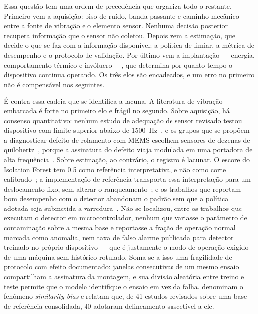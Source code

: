 Essa questão tem uma ordem de precedência que organiza todo o restante. Primeiro vem a
aquisição: piso de ruído, banda passante e caminho mecânico entre a fonte de vibração e o
elemento sensor. Nenhuma decisão posterior recupera informação que o sensor não coletou.
Depois vem a estimação, que decide o que se faz com a informação disponível: a política de
limiar, a métrica de desempenho e o protocolo de validação. Por último vem a implantação
--- energia, comportamento térmico e invólucro ---, que determina por quanto tempo o
dispositivo continua operando. Os três elos são encadeados, e um erro no primeiro não é
compensável nos seguintes.

É contra essa cadeia que se identifica a lacuna. A literatura de vibração embarcada é
forte no primeiro elo e frágil no segundo. Sobre aquisição, há consenso quantitativo:
nenhum estudo de adequação de sensor revisado testou dispositivo com limite superior
abaixo de \SI{1500}{\hertz}~\cite{albarbar2008}, e os grupos que se propõem a diagnosticar
defeito de rolamento com MEMS escolhem sensores de dezenas de
quilohertz~\cite{landi2023,jakobsen2024}, porque a assinatura do defeito viaja modulada em
uma portadora de alta frequência~\cite{randall2011,antoni2007}. Sobre estimação, ao
contrário, o registro é lacunar. O escore do Isolation Forest tem \num{0,5} como
referência interpretativa, e não como corte calibrado~\cite{liu2008}; a implementação de
referência transporta essa interpretação para um deslocamento fixo, sem alterar o
ranqueamento~\cite{scikitlearn2026}; e os trabalhos que reportam bom desempenho com o
detector abandonam o padrão sem que a política adotada seja submetida a
varredura~\cite{antonini2023,brito2022}. Não se localizou, entre os trabalhos que executam
o detector em microcontrolador, nenhum que variasse o parâmetro de contaminação sobre a
mesma base e reportasse a fração de operação normal marcada como anomalia, nem taxa de
falso alarme publicada para detector treinado no próprio dispositivo --- que é justamente
o modo de operação exigido de uma máquina sem histórico rotulado. Soma-se a isso uma
fragilidade de protocolo com efeito documentado: janelas consecutivas de um mesmo ensaio
compartilham a assinatura da montagem, e sua divisão aleatória entre treino e teste
permite que o modelo identifique o ensaio em vez da falha. 
denominam o fenômeno \emph{similarity bias} e relatam que, de \num{41} estudos revisados
sobre uma base de referência consolidada, \num{40} adotaram delineamento suscetível a ele.

